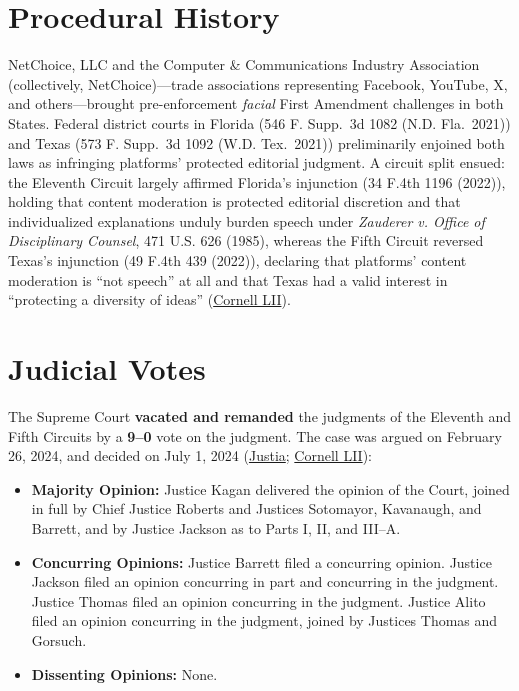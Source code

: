 \documentclass[12pt]{article}
\begin{document}
\section{Procedural History}
NetChoice, LLC and the Computer \& Communications Industry Association (collectively, NetChoice)---trade associations representing Facebook, YouTube, X, and others---brought pre-enforcement \emph{facial} First Amendment challenges in both States. Federal district courts in Florida (546 F. Supp.~3d 1082 (N.D. Fla.~2021)) and Texas (573 F. Supp.~3d 1092 (W.D. Tex.~2021)) preliminarily enjoined both laws as infringing platforms' protected editorial judgment. A circuit split ensued: the Eleventh Circuit largely affirmed Florida's injunction (34 F.4th 1196 (2022)), holding that content moderation is protected editorial discretion and that individualized explanations unduly burden speech under \textit{Zauderer v. Office of Disciplinary Counsel}, 471 U.S. 626 (1985), whereas the Fifth Circuit reversed Texas's injunction (49 F.4th 439 (2022)), declaring that platforms' content moderation is ``not speech'' at all and that Texas had a valid interest in ``protecting a diversity of ideas'' (\href{https://www.law.cornell.edu/supremecourt/text/22-277}{Cornell LII}).

\section{Judicial Votes}
The Supreme Court \textbf{vacated and remanded} the judgments of the Eleventh and Fifth Circuits by a \textbf{9--0} vote on the judgment. The case was argued on February 26, 2024, and decided on July 1, 2024 (\href{https://supreme.justia.com/cases/federal/us/603/22-277/}{Justia}; \href{https://www.law.cornell.edu/supremecourt/text/22-277}{Cornell LII}):

\begin{itemize}
    \item \textbf{Majority Opinion:} Justice Kagan delivered the opinion of the Court, joined in full by Chief Justice Roberts and Justices Sotomayor, Kavanaugh, and Barrett, and by Justice Jackson as to Parts I, II, and III--A.
    \item \textbf{Concurring Opinions:} Justice Barrett filed a concurring opinion. Justice Jackson filed an opinion concurring in part and concurring in the judgment. Justice Thomas filed an opinion concurring in the judgment. Justice Alito filed an opinion concurring in the judgment, joined by Justices Thomas and Gorsuch.
    \item \textbf{Dissenting Opinions:} None.
\end{itemize}
\end{document}
